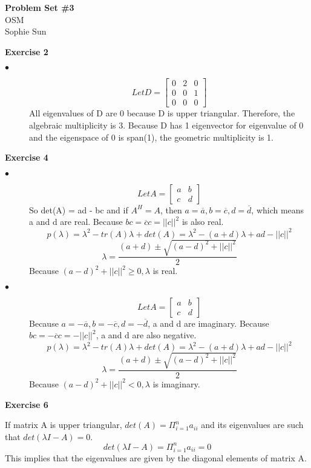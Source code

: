 \documentclass[letterpaper,12pt]{article}
\theoremstyle{definition}
\begin{document}
\begin{flushleft}
  \textbf{\large{Problem Set \#3}} \\
  OSM \\
  Sophie Sun
\end{flushleft}

\vspace{3mm}
\noindent\textbf{Exercise 2}
\begin{description}
  \item[$\bullet$] 
 \[ Let D =
  \begin{bmatrix}
   0 & 2 & 0 \\
   0 & 0 & 1 \\
   0 & 0 & 0
\end{bmatrix}
\]
All eigenvalues of D are 0 because D is upper triangular. Therefore, the algebraic multiplicity is 3. Because D has 1 eigenvector for eigenvalue of 0 and the eigenspace of 0 is span({1}), the geometric multiplicity is 1.
\end{description}

\noindent\textbf{Exercise 4} 
\begin{description}
\item [$\bullet$]
 \[ Let A =
  \begin{bmatrix}
   a & b \\
   c & d
\end{bmatrix}
\]
So det(A) = ad - bc and if $A^H = A$, then $a = \overline{a}, b = \overline{c}, d = \overline{d}$, which means a and d are real. Because $bc = \overline{c}c = ||c||^2$ is also real. 
\[p(\lambda) = \lambda^2 -tr(A)\lambda + det(A) = \lambda^2 - (a + d)\lambda + ad - ||c||^2\] 
\[\lambda = \frac{(a + d) \pm \sqrt{(a - d) ^2 + ||c||^2}}{2}\]
Because $(a - d)^2 + ||c||^2 \geq 0, \lambda$ is real.
\item [$\bullet$] 
 \[ Let A =
  \begin{bmatrix}
   a & b \\
   c & d
\end{bmatrix}
\]
Because $a = -\overline{a}, b = -\overline{c}, d = -\overline{d}$, a and d are imaginary. Because $bc = -\overline{c}c = -||c||^2$, a and d are also negative. 
\[p(\lambda) = \lambda^2 -tr(A)\lambda + det(A) = \lambda^2 - (a + d)\lambda + ad - ||c||^2\] 
\[\lambda = \frac{(a + d) \pm \sqrt{(a - d) ^2 + ||c||^2}}{2}\]
Because $(a - d)^2 + ||c||^2 < 0, \lambda$ is imaginary.
\end{description}

\vspace{3mm}
\noindent\textbf{Exercise 6}
\begin{description}
 \item If matrix A is upper triangular, $det(A) = \Pi_{i=1}^n a_{ii}$ and its eigenvalues are such that $det(\lambda I -A) = 0$. 
 \[det(\lambda I -A) =  \Pi_{i=1}^n a_{ii} = 0\]
 This implies that the eigenvalues are given by the diagonal elements of matrix A.
\end{description}
\end{document}
